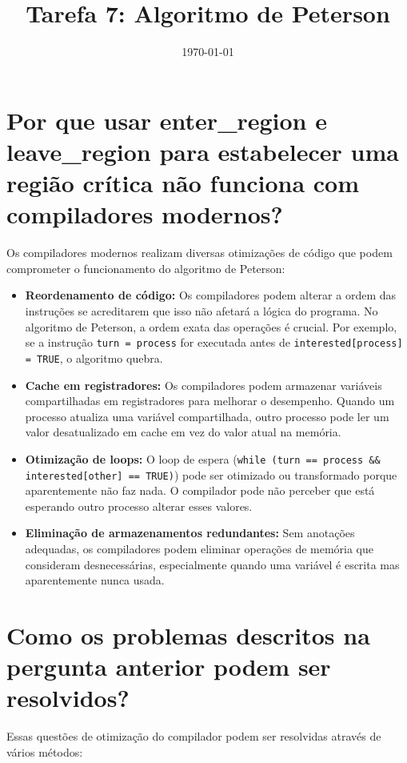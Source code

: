 \documentclass[12pt]{article}
\title{Tarefa 7: Algoritmo de Peterson}
\author{}
\date{\today}
\begin{document}
\maketitle

\section{Por que usar enter\_region e leave\_region para estabelecer uma região crítica não funciona com compiladores modernos?}

Os compiladores modernos realizam diversas otimizações de código que podem comprometer o funcionamento do algoritmo de Peterson:

\begin{itemize}
    \item \textbf{Reordenamento de código:} Os compiladores podem alterar a ordem das instruções se acreditarem que isso não afetará a lógica do programa. No algoritmo de Peterson, a ordem exata das operações é crucial. Por exemplo, se a instrução \texttt{turn = process} for executada antes de \texttt{interested[process] = TRUE}, o algoritmo quebra.

    \item \textbf{Cache em registradores:} Os compiladores podem armazenar variáveis compartilhadas em registradores para melhorar o desempenho. Quando um processo atualiza uma variável compartilhada, outro processo pode ler um valor desatualizado em cache em vez do valor atual na memória.

    \item \textbf{Otimização de loops:} O loop de espera (\texttt{while (turn == process \&\& interested[other] == TRUE)}) pode ser otimizado ou transformado porque aparentemente não faz nada. O compilador pode não perceber que está esperando outro processo alterar esses valores.

    \item \textbf{Eliminação de armazenamentos redundantes:} Sem anotações adequadas, os compiladores podem eliminar operações de memória que consideram desnecessárias, especialmente quando uma variável é escrita mas aparentemente nunca usada.
\end{itemize}

\section{Como os problemas descritos na pergunta anterior podem ser resolvidos?}

Essas questões de otimização do compilador podem ser resolvidas através de vários métodos:
\end{document}
